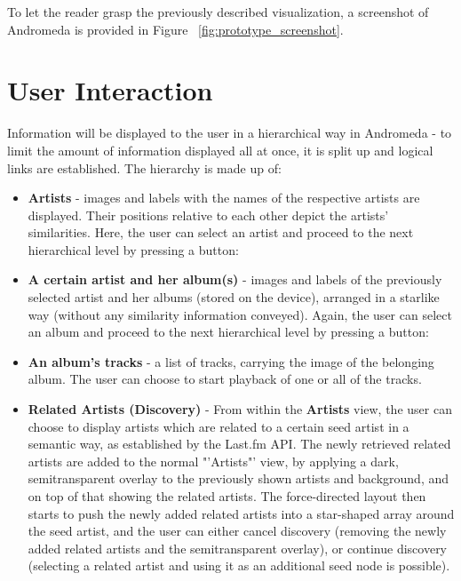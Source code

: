 To let the reader grasp the previously described visualization, a screenshot of Andromeda is provided in Figure ~\ref{fig:prototype_screenshot}.

\section{User Interaction}

Information will be displayed to the user in a hierarchical way in Andromeda - to limit the amount of information displayed all at once, it is split up and logical links are established. The hierarchy is made up of:

\begin{itemize}
	\item \textbf{Artists} - images and labels with the names of the respective artists are displayed. Their positions relative to each other depict the artists' similarities. Here, the user can select an artist and proceed to the next hierarchical level by pressing a button:
	\item \textbf{A certain artist and her album(s)} - images and labels of the previously selected artist and her albums (stored on the device), arranged in a starlike way (without any similarity information conveyed). Again, the user can select an album and proceed to the next hierarchical level by pressing a button:
	\item \textbf{An album's tracks} - a list of tracks, carrying the image of the belonging album. The user can choose to start playback of one or all of the tracks.
	\item \textbf{Related Artists (Discovery)} - From within the \textbf{Artists} view, the user can choose to display artists which are related to a certain seed artist in a semantic way, as established by the Last.fm API. The newly retrieved related artists are added to the normal "'Artists"' view, by applying a dark, semitransparent overlay to the previously shown artists and background, and on top of that showing the related artists. The force-directed layout then starts to push the newly added related artists into a star-shaped array around the seed artist, and the user can either cancel discovery (removing the newly added related artists and the semitransparent overlay), or continue discovery (selecting a related artist and using it as an additional seed node is possible).
	
\end{itemize}


